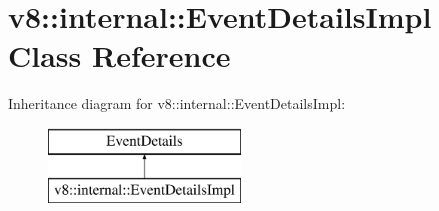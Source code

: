 \hypertarget{classv8_1_1internal_1_1_event_details_impl}{}\section{v8\+:\+:internal\+:\+:Event\+Details\+Impl Class Reference}
\label{classv8_1_1internal_1_1_event_details_impl}
Inheritance diagram for v8\+:\+:internal\+:\+:Event\+Details\+Impl\+:\begin{figure}[H]
\begin{center}
\leavevmode
\includegraphics[height=2.000000cm]{classv8_1_1internal_1_1_event_details_impl}
\end{center}
\end{figure}
